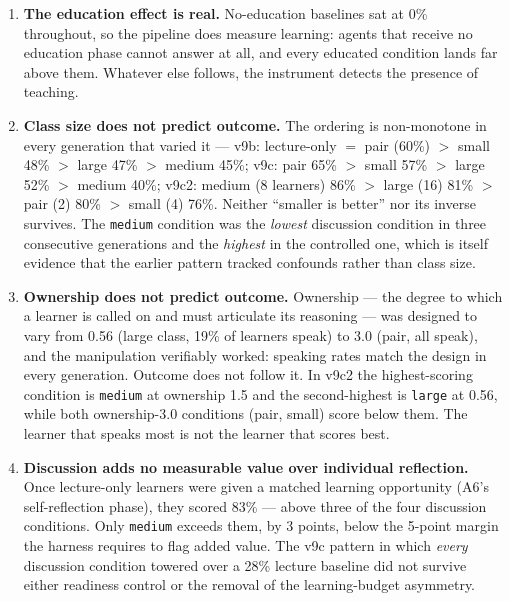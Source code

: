 \documentclass[11pt]{article}
\begin{document}
\begin{enumerate}
  \item \textbf{The education effect is real.}  No-education baselines sat at 0\%
    throughout, so the pipeline does measure learning: agents that receive no
    education phase cannot answer at all, and every educated condition lands far
    above them.  Whatever else follows, the instrument detects the presence of
    teaching.

  \item \textbf{Class size does not predict outcome.}  The ordering is non-monotone
    in every generation that varied it --- v9b: lecture-only $=$ pair (60\%) $>$
    small 48\% $>$ large 47\% $>$ medium 45\%; v9c: pair 65\% $>$ small 57\% $>$
    large 52\% $>$ medium 40\%; v9c2: medium (8 learners) 86\% $>$ large (16) 81\%
    $>$ pair (2) 80\% $>$ small (4) 76\%.  Neither ``smaller is better'' nor its
    inverse survives.  The \texttt{medium} condition was the \emph{lowest} discussion
    condition in three consecutive generations and the \emph{highest} in the
    controlled one, which is itself evidence that the earlier pattern tracked
    confounds rather than class size.

  \item \textbf{Ownership does not predict outcome.}  Ownership --- the degree to
    which a learner is called on and must articulate its reasoning --- was designed
    to vary from 0.56 (large class, 19\% of learners speak) to 3.0 (pair, all speak),
    and the manipulation verifiably worked: speaking rates match the design in every
    generation.  Outcome does not follow it.  In v9c2 the highest-scoring condition
    is \texttt{medium} at ownership 1.5 and the second-highest is \texttt{large} at
    0.56, while both ownership-3.0 conditions (pair, small) score below them.  The
    learner that speaks most is not the learner that scores best.

  \item \textbf{Discussion adds no measurable value over individual reflection.}
    Once lecture-only learners were given a matched learning opportunity (A6's
    self-reflection phase), they scored 83\% --- above three of the four discussion
    conditions.  Only \texttt{medium} exceeds them, by 3 points, below the 5-point
    margin the harness requires to flag added value.  The v9c pattern in which
    \emph{every} discussion condition towered over a 28\% lecture baseline did not
    survive either readiness control or the removal of the learning-budget
    asymmetry.


\end{enumerate}
\end{document}
